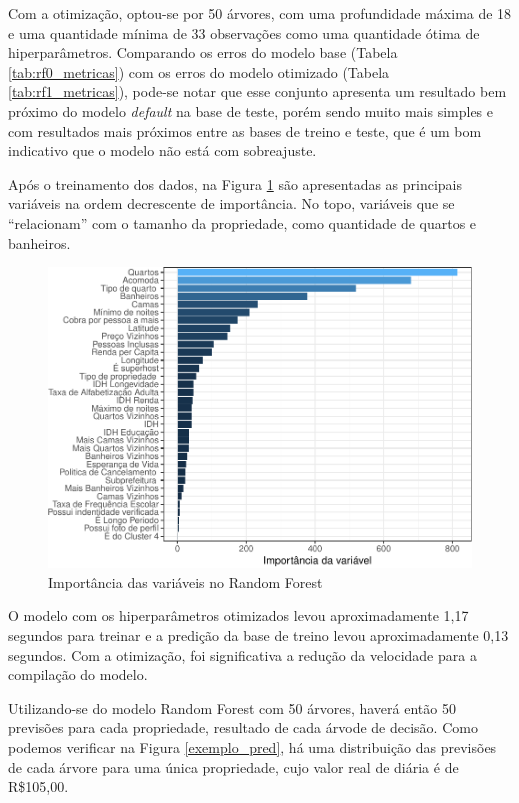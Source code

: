 \documentclass[
	12pt,				%
	a4paper,		%
	oneside,    %
	chapter=TITLE,		   %
	section=TITLE,		   %
	subsection=TITLE,	   %
	subsubsection=TITLE, %
	english,			%
	french,				%
	spanish,			%
	brazil,				%
]{abntex2}
\begin{document}
Com a otimização, optou-se por 50 árvores, com uma profundidade máxima
de 18 e uma quantidade mínima de 33 observações como uma quantidade
ótima de hiperparâmetros. Comparando os erros do modelo base (Tabela
\ref{tab:rf0_metricas}) com os erros do modelo otimizado (Tabela
\ref{tab:rf1_metricas}), pode-se notar que esse conjunto apresenta um
resultado bem próximo do modelo \emph{default} na base de teste, porém
sendo muito mais simples e com resultados mais próximos entre as bases
de treino e teste, que é um bom indicativo que o modelo não está com
sobreajuste.

Após o treinamento dos dados, na Figura \ref{imp_var_rf} são
apresentadas as principais variáveis na ordem decrescente de
importância. No topo, variáveis que se ``relacionam'' com o tamanho da
propriedade, como quantidade de quartos e banheiros.

\begin{figure}
\centering
\includegraphics{00-TCC_files/figure-latex/imp_var_rf-1.pdf}
\caption{\label{imp_var_rf}Importância das variáveis no Random Forest}
\end{figure}

O modelo com os hiperparâmetros otimizados levou aproximadamente 1,17
segundos para treinar e a predição da base de treino levou
aproximadamente 0,13 segundos. Com a otimização, foi significativa a
redução da velocidade para a compilação do modelo.

Utilizando-se do modelo Random Forest com 50 árvores, haverá então 50
previsões para cada propriedade, resultado de cada árvode de decisão.
Como podemos verificar na Figura \ref{exemplo_pred}, há uma distribuição
das previsões de cada árvore para uma única propriedade, cujo valor real
de diária é de R\$105,00.
\end{document}
